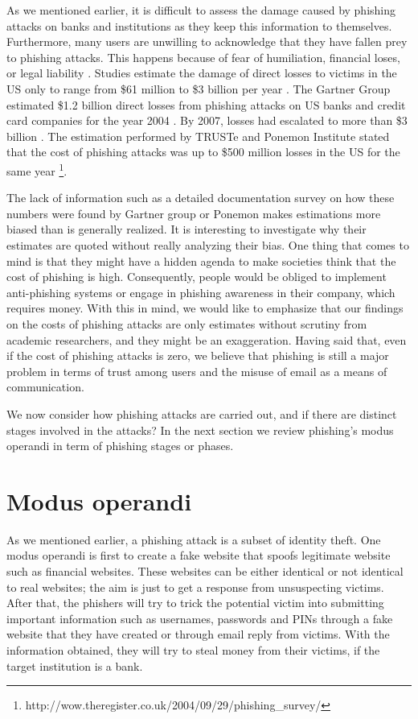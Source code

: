 As we mentioned earlier, it is difficult to assess the damage caused
by phishing attacks on banks and institutions as they keep this information
to themselves. Furthermore, many users are unwilling to acknowledge
that they have fallen prey to phishing attacks. This happens because
of fear of humiliation, financial loses, or legal liability \citep{jakobsson:2006}.
Studies estimate the damage of direct losses to victims in the US
only \citep{hong:2012}\citep{moura2009scalable} to range from \$61
million \citep{herley:2009} to \$3 billion per year \citep{mccall2007gartner}.
The Gartner Group estimated \$1.2 billion direct losses from phishing
attacks on US banks and credit card companies for the year 2004 \citep{litan2004phishing}.
By 2007, losses had escalated to more than \$3 billion \citep{mccall2007gartner}.
The estimation performed by TRUSTe and Ponemon Institute stated that
the cost of phishing attacks was up to \$500 million losses in the
US for the same year %
\footnote{http://wow.theregister.co.uk/2004/09/29/phishing\_survey/%
}.

The lack of information such as a detailed documentation survey on
how these numbers were found by Gartner group or Ponemon makes estimations
more biased than is generally realized. It is interesting to investigate
why their estimates are quoted without really analyzing their bias.
One thing that comes to mind is that they might have a hidden agenda
to make societies think that the cost of phishing is high. Consequently,
people would be obliged to implement anti-phishing systems or engage
in phishing awareness in their company, which requires money. With
this in mind, we would like to emphasize that our findings on the
costs of phishing attacks are only estimates without scrutiny from
academic researchers, and they might be an exaggeration. Having said
that, even if the cost of phishing attacks is zero, we believe that
phishing is still a major problem in terms of trust among users and
the misuse of email as a means of communication.

We now consider how phishing attacks are carried out, and if there
are distinct stages involved in the attacks? In the next section we
review phishing's modus operandi in term of phishing stages or phases.


\section{Modus operandi}

As we mentioned earlier, a phishing attack is a subset of identity
theft. One modus operandi is first to create a fake website that spoofs
legitimate website such as financial websites. These websites can
be either identical or not identical to real websites; the aim is
just to get a response from unsuspecting victims. After that, the
phishers will try to trick the potential victim into submitting important
information such as usernames, passwords and PINs through a fake website
that they have created or through email reply from victims. With the
information obtained, they will try to steal money from their victims,
if the target institution is a bank. 

